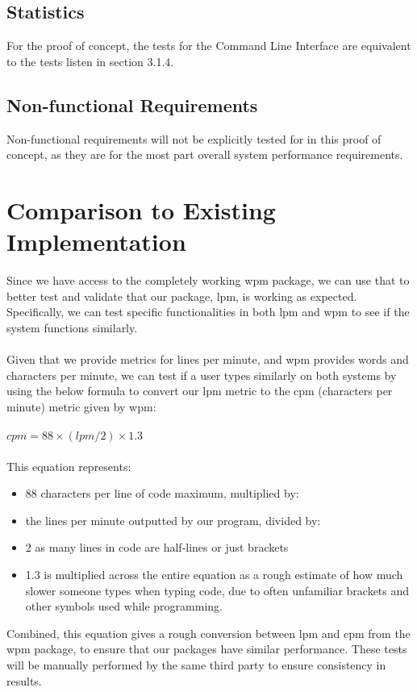 \documentclass[12pt, titlepage]{article}
\begin{document}
\subsection{Statistics}

For the proof of concept, the tests for the Command Line Interface are equivalent to the tests listen in section 3.1.4.

\subsection{Non-functional Requirements}

Non-functional requirements will not be explicitly tested for in this proof of concept, as they are for the most part overall system performance requirements.

\section{Comparison to Existing Implementation}
Since we have access to the completely working wpm package, we can use that to better test and validate that our package, lpm, is working as expected. Specifically, we can test specific functionalities in both lpm and wpm to see if the system functions similarly. \\ \\ Given that we provide metrics for lines per minute, and wpm provides words and characters per minute, we can test if a user types similarly on both systems by using the below formula to convert our lpm metric to the cpm (characters per minute) metric given by wpm: \\ \\
 $cpm = 88 \times (lpm / 2) \times 1.3$ \\ \\
This equation represents:
\begin{itemize}
    \item 88 characters per line of code maximum, multiplied by:
    \item the lines per minute outputted by our program, divided by:
    \item 2 as many lines in code are half-lines or just brackets
    \item 1.3 is multiplied across the entire equation as a rough estimate of how much slower someone types when typing code, due to often unfamiliar brackets and other symbols used while programming.
\end{itemize}
Combined, this equation gives a rough conversion between lpm and cpm from the wpm package, to ensure that our packages have similar performance. These tests will be manually performed by the same third party to ensure consistency in results. \\
\end{document}
